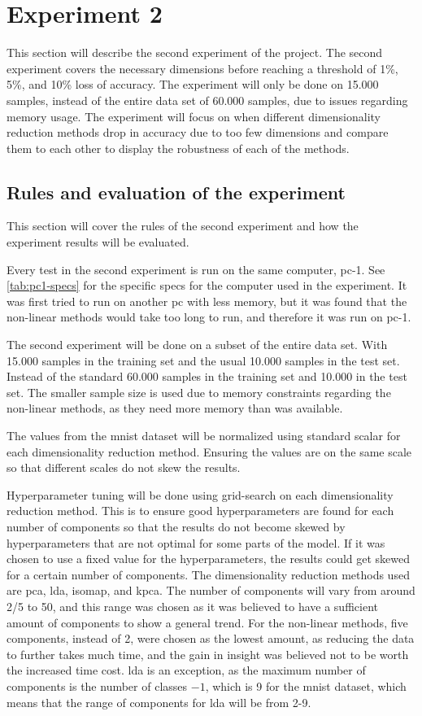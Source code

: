 \section{Experiment 2}\label{sec:experiment-2}
This section will describe the second experiment of the project. The second experiment covers the necessary dimensions before reaching a threshold of 1\%, 5\%, and 10\% loss of accuracy. The experiment will only be done on 15.000 samples, instead of the entire data set of 60.000 samples, due to issues regarding memory usage. The experiment will focus on when different dimensionality reduction methods drop in accuracy due to too few dimensions and compare them to each other to display the robustness of each of the methods.


\subsection{Rules and evaluation of the experiment}\label{subsec:experiment_2_rules}
This section will cover the rules of the second experiment and how the experiment results will be evaluated.

Every test in the second experiment is run on the same computer, pc-1. See \autoref{tab:pc1-specs} for the specific specs for the computer used in the experiment. It was first tried to run on another pc with less memory, but it was found that the non-linear methods would take too long to run, and therefore it was run on pc-1.

The second experiment will be done on a subset of the entire data set. With 15.000 samples in the training set and the usual 10.000 samples in the test set. Instead of the standard 60.000 samples in the training set and 10.000 in the test set. The smaller sample size is used due to memory constraints regarding the non-linear methods, as they need more memory than was available.

The values from the mnist dataset will be normalized using standard scalar for each dimensionality reduction method. Ensuring the values are on the same scale so that different scales do not skew the results.

Hyperparameter tuning will be done using grid-search on each dimensionality reduction method. This is to ensure good hyperparameters are found for each number of components so that the results do not become skewed by hyperparameters that are not optimal for some parts of the model. If it was chosen to use a fixed value for the hyperparameters, the results could get skewed for a certain number of components.
The dimensionality reduction methods used are \gls{pca}, \gls{lda}, \gls{isomap}, and \gls{kpca}. The number of components will vary from around 2/5 to 50, and this range was chosen as it was believed to have a sufficient amount of components to show a general trend. For the non-linear methods, five components, instead of 2, were chosen as the lowest amount, as reducing the data to further takes much time, and the gain in insight was believed not to be worth the increased time cost. \gls{lda} is an exception, as the maximum number of components is the number of classes $-1$, which is 9 for the \gls{mnist} dataset, which means that the range of components for \gls{lda} will be from 2-9.

